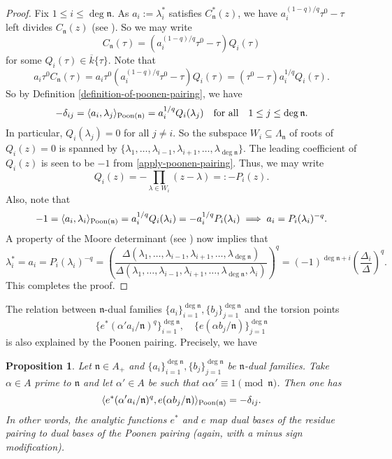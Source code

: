 \documentclass[11pt]{amsart}
\theoremstyle{plain}
\newtheorem{prop}[thm]{Proposition}
\theoremstyle{definition}
\theoremstyle{remark}
\numberwithin{equation}{section}
\newcommand{\nfk}{\mathfrak{n}}
\newcommand{\ovl}{\overline}
\newcommand{\sbe}{\subseteq}
\newcommand{\ang}[1]{\langle #1 \rangle}
\begin{document}
	\begin{proof}
		Fix $1\leq i \leq \deg\nfk$. As $a_i := \lambda_i^*$ satisfies $C_\nfk^*(z)$, we have $a_i^{(1-q)/q} \tau^0 - \tau$ left divides $C_\nfk(z)$ (see \cite[Corollary 1.7.7]{goss1996basic}).
		So we may write
		$$
		C_\nfk(\tau) = \left(a_i^{(1-q)/q} \tau^0 - \tau\right) Q_i(\tau)
		$$
		for some $Q_i(\tau) \in \ovl{k}\{\tau\}$.
		Note that
		\begin{equation}   \label{apply-poonen-pairing}
			a_i\tau^0 C_\nfk(\tau)
			= a_i\tau^0 \left(a_i^{(1-q)/q} \tau^0 - \tau\right) Q_i(\tau)
			= (\tau^0-\tau) a_i^{1/q} Q_i(\tau).
		\end{equation}
		So by Definition \ref{definition-of-poonen-pairing}, we have
		$$
		-\delta_{ij}
		= \ang{a_i, \lambda_j}_{\textnormal{Poon}(\nfk)}
		= a_i^{1/q} Q_i(\lambda_j)
		\quad
		\text{for all}
		\quad
		1 \leq j \leq \deg\nfk.
		$$
		In particular, $Q_i(\lambda_j) = 0$ for all $j\neq i$.
		So the subspace $W_i \sbe \Lambda_\nfk$ of roots of $Q_i(z) = 0$ is spanned by $\{\lambda_1,\ldots,\lambda_{i-1},\lambda_{i+1},\ldots,\lambda_{\deg\nfk}\}$.
		The leading coefficient of $Q_i(z)$ is seen to be $-1$ from \eqref{apply-poonen-pairing}. 
		Thus, we may write
		$$
		Q_i(z) = - \prod_{\lambda \in W_i} (z - \lambda) =: -P_i(z).
		$$
		Also, note that
		$$
		-1 
		= \ang{a_i, \lambda_i}_{\textnormal{Poon}(\nfk)}
		= a_i^{1/q} Q_i(\lambda_i)
		= -a_i^{1/q} P_i(\lambda_i)
		\implies
		a_i = P_i(\lambda_i)^{-q}.
		$$
		A property of the Moore determinant (see \cite[Theorem 1.3.5.2]{goss1996basic}) now implies that
		$$
		\lambda_i^* 
		= a_i
		= P_i(\lambda_i)^{-q}
		= \left(\frac{\Delta(\lambda_1,\ldots,\lambda_{i-1},\lambda_{i+1},\ldots,\lambda_{\deg\nfk})}{\Delta(\lambda_1,\ldots,\lambda_{i-1},\lambda_{i+1},\ldots,\lambda_{\deg\nfk},\lambda_i)}\right)^q
		= (-1)^{\deg\nfk+i} \left(\frac{\Delta_i}{\Delta}\right)^q.
		$$
		This completes the proof.
	\end{proof}
	
	The relation between $\nfk$-dual families $\{a_i\}_{i=1}^{\deg\nfk}, \{b_j\}_{j=1}^{\deg\nfk}$ and the torsion points
	$$
	\{e^*(\alpha' a_i/\nfk)^q\}_{i=1}^{\deg\nfk},
	\quad
	\{e(\alpha b_j/\nfk)\}_{j=1}^{\deg\nfk}
	$$
	is also explained by the Poonen pairing. Precisely, we have
	
	\begin{prop}    \label{residue-and-poonen}
		Let $\nfk \in A_+$ and $\{a_i\}_{i=1}^{\deg\nfk}, \{b_j\}_{j=1}^{\deg\nfk}$ be $\nfk$-dual families.
		Take $\alpha \in A$ prime to $\nfk$ and let $\alpha' \in A$ be such that $\alpha\alpha' \equiv 1 \pmod{\nfk}$.
		Then one has
		$$
		\ang{e^*(\alpha' a_i/\nfk)^q, e(\alpha b_j/\nfk)}_{\textnormal{Poon}(\nfk)} = - \delta_{ij}.
		$$
		In other words, the analytic functions $e^*$ and $e$ map dual bases of the residue pairing to dual bases of the Poonen pairing (again, with a minus sign modification).
	\end{prop}
	
\end{document}
